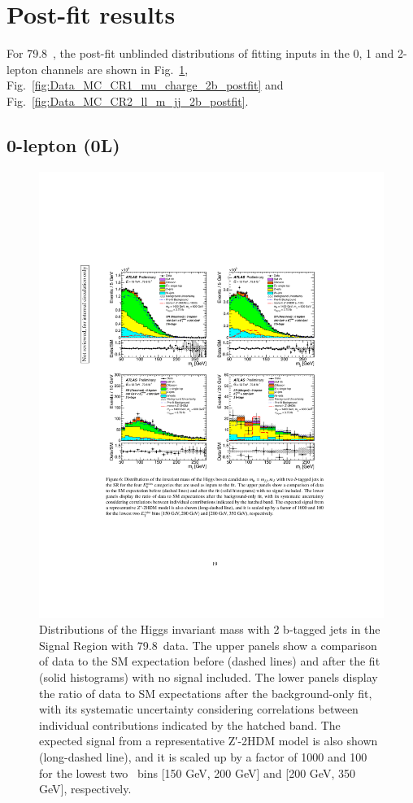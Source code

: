 \section{Post-fit results}
\par For 79.8~\ifb, the post-fit unblinded distributions of fitting inputs in the 0, 1 and 2-lepton channels are shown in Fig.~\ref{fig:Data_MC_SR_m_jj_2b_postfit}, Fig.~\ref{fig:Data_MC_CR1_mu_charge_2b_postfit} and Fig.~\ref{fig:Data_MC_CR2_ll_m_jj_2b_postfit}.
\subsection{0-lepton (0L)}
\begin{figure}[H]
  \centering
    \includegraphics[width=13cm, trim={4cm 9cm 4cm 6cm}, clip]{chapters/c9/figures/post-fit-0lep.pdf}

  \caption{Distributions of the Higgs invariant mass with 2 b-tagged jets in the Signal Region with 79.8~\ifb data. The upper panels show a comparison of data to the SM expectation before (dashed lines) and after the fit (solid histograms) with no signal included. The lower
panels display the ratio of data to SM expectations after the background-only fit, with its systematic uncertainty considering correlations between 
    individual contributions indicated by the hatched band. The expected signal from a representative Z′-2HDM model is also shown (long-dashed line), 
    and it is scaled up by a factor of 1000 and 100 for the lowest two \met~bins [150 GeV, 200 GeV] and [200 GeV, 350 GeV], respectively.}
  \label{fig:Data_MC_SR_m_jj_2b_postfit}
  \end{figure}
  
